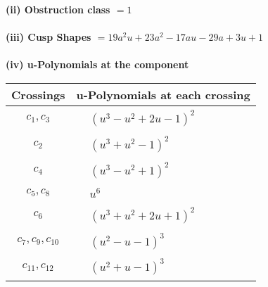\documentclass[1p]{elsarticle_modified}
\theoremstyle{definition}
\begin{document}
\flushleft \textbf{(ii) Obstruction class $= 1$}\\~\\
\flushleft \textbf{(iii) Cusp Shapes $= 19 a^2 u+23 a^2-17 a u-29 a+3 u+1$}\\~\\
\newpage\renewcommand{\arraystretch}{1}
\flushleft \textbf{(iv) u-Polynomials at the component}\newline \\
\begin{tabular}{m{50pt}|m{274pt}}
Crossings & \hspace{64pt}u-Polynomials at each crossing \\
\hline $$\begin{aligned}c_{1},c_{3}\end{aligned}$$&$\begin{aligned}
&(u^3- u^2+2 u-1)^2
\end{aligned}$\\
\hline $$\begin{aligned}c_{2}\end{aligned}$$&$\begin{aligned}
&(u^3+u^2-1)^2
\end{aligned}$\\
\hline $$\begin{aligned}c_{4}\end{aligned}$$&$\begin{aligned}
&(u^3- u^2+1)^2
\end{aligned}$\\
\hline $$\begin{aligned}c_{5},c_{8}\end{aligned}$$&$\begin{aligned}
&u^6
\end{aligned}$\\
\hline $$\begin{aligned}c_{6}\end{aligned}$$&$\begin{aligned}
&(u^3+u^2+2 u+1)^2
\end{aligned}$\\
\hline $$\begin{aligned}c_{7},c_{9},c_{10}\end{aligned}$$&$\begin{aligned}
&(u^2- u-1)^3
\end{aligned}$\\
\hline $$\begin{aligned}c_{11},c_{12}\end{aligned}$$&$\begin{aligned}
&(u^2+u-1)^3
\end{aligned}$\\
\hline
\end{tabular}\\~\\
\end{document}
